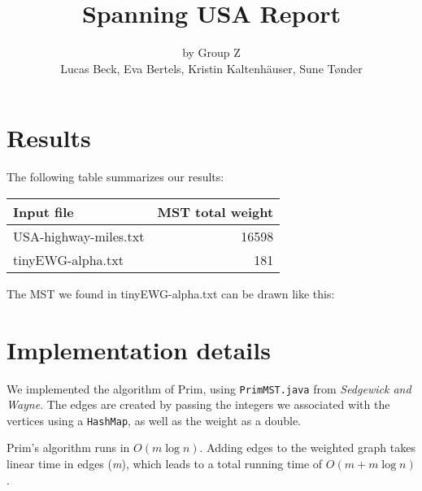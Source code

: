 \documentclass{tufte-handout}
\title{Spanning USA Report}
\author{by Group Z\\ Lucas Beck, Eva Bertels, Kristin Kaltenh\"{a}user, Sune T\o nder}
\begin{document}
  \maketitle

  \section{Results}

  The following table summarizes our results:
  
  \bigskip\noindent
  \begin{tabular}{lr}
    \toprule
    Input file & MST total weight \\ \midrule
    USA-highway-miles.txt	 & 16598 \\
    tinyEWG-alpha.txt & 181 \\ \bottomrule
  \end{tabular}

  \bigskip
\noindent The MST we found in tinyEWG-alpha.txt can be drawn like this:

  \medskip


  \section{Implementation details}

We implemented the algorithm of Prim, using \texttt{PrimMST.java} from \textit{Sedgewick and Wayne}.
  The edges are created by passing the integers we associated with the vertices using a \texttt{HashMap}, as well as the weight as a double.

\bigskip

Prim's algorithm runs in $O(m\log n)$. 
  Adding edges to the weighted graph takes linear time in edges (\textit{m}), which leads to a total running time of $O(m + m \log n)$.

\end{document}
